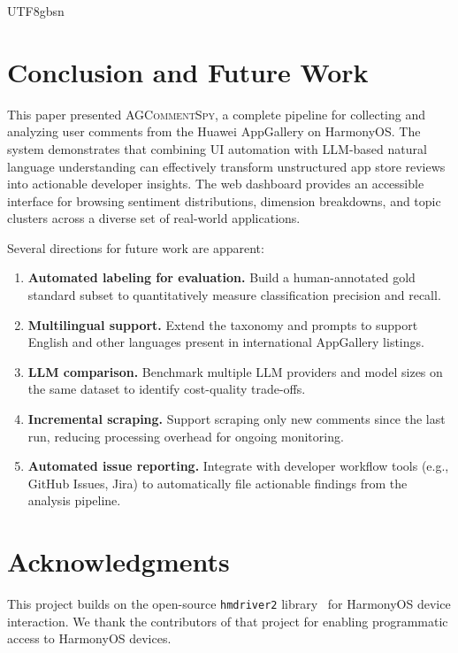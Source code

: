 \documentclass[11pt,a4paper]{article}
\begin{document}
\begin{CJK*}{UTF8}{gbsn}
\section{Conclusion and Future Work}

This paper presented \textsc{AGCommentSpy}, a complete pipeline for collecting and analyzing user comments from the Huawei AppGallery on HarmonyOS. The system demonstrates that combining UI automation with LLM-based natural language understanding can effectively transform unstructured app store reviews into actionable developer insights. The web dashboard provides an accessible interface for browsing sentiment distributions, dimension breakdowns, and topic clusters across a diverse set of real-world applications.

Several directions for future work are apparent:

\begin{enumerate}[nosep]
  \item \textbf{Automated labeling for evaluation.} Build a human-annotated gold standard subset to quantitatively measure classification precision and recall.
  \item \textbf{Multilingual support.} Extend the taxonomy and prompts to support English and other languages present in international AppGallery listings.
  \item \textbf{LLM comparison.} Benchmark multiple LLM providers and model sizes on the same dataset to identify cost-quality trade-offs.
  \item \textbf{Incremental scraping.} Support scraping only new comments since the last run, reducing processing overhead for ongoing monitoring.
  \item \textbf{Automated issue reporting.} Integrate with developer workflow tools (e.g., GitHub Issues, Jira) to automatically file actionable findings from the analysis pipeline.
\end{enumerate}


\section*{Acknowledgments}

This project builds on the open-source \texttt{hmdriver2} library~\cite{hmdriver2} for HarmonyOS device interaction. We thank the contributors of that project for enabling programmatic access to HarmonyOS devices.



\end{CJK*}
\end{document}
